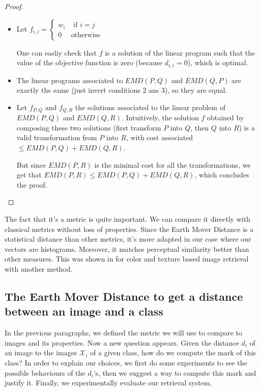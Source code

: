 \begin{proof}

\begin{itemize}
	\item Let $f_{i,j} = \begin{cases}
                        	w_i & \text{ if } i = j\\ 
                       	 	0 & \text{otherwise}
                   	 	 \end{cases}$
	
	One can easliy check that $f$ is a solution of the linear program such that the value of the objective function is zero (because $d_{i,i} = 0$), which is optimal.

	\item The linear programs associated to $EMD(P,Q)$ and $EMD(Q,P)$ are exactly the same (just invert conditions $2$ ans $3$), so they are equal.

	\item Let $f_{P,Q}$ and $f_{Q,R}$ the solutions associated to the linear problem of $EMD(P,Q)$ and $EMD(Q,R)$. Intuitively, the solution $f$ obtained by composing these two solutions (first transform $P$ into $Q$, then $Q$ into $R$) is a valid transformation from $P$ into $R$, with cost associated $\leq EMD(P,Q)+EMD(Q,R)$. 

	But since $EMD(P,R)$ is the minimal cost for all the transformations, we get that $EMD(P,R) \leq EMD(P,Q) + EMD(Q,R)$, which concludes the proof.
\end{itemize}

\end{proof}

The fact that it's a metric is quite important. We can compare it directly with classical metrics without loss of properties. Since the Earth Mover Distance is a statistical distance than other metrics, it's more adapted in our case where our vectors are histograms. Moreover, it matches perceptual similarity better than other measures. This was shown in \cite{EMD-use} for color and texture based image retrieval with another method.

\subsection{The Earth Mover Distance to get a distance between an image and a class}

In the previous paragraphs, we defined the metric we will use to compare to images and its properties. Now a new question appears. Given the distance $d_i$ of an image to the images $\mathcal{X}_i$ of a given class, how do we compute the mark of this class? In order to explain our choices, we first do some experiments to see the possible behaviours of the $d_i$'s, then we suggest a way to compute this mark and justify it. Finally, we experimentally evaluate our retrieval system.

